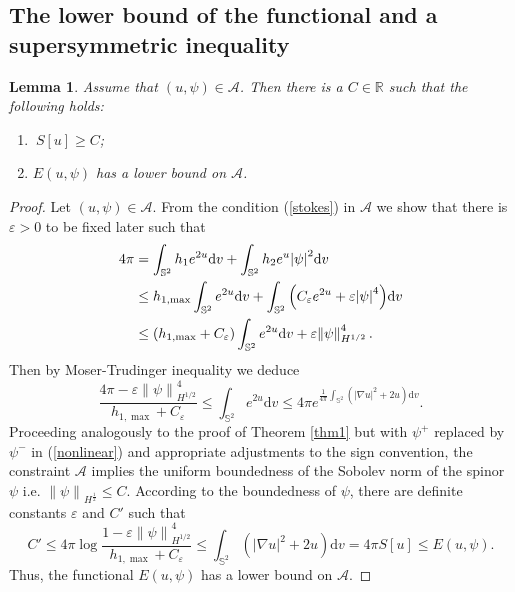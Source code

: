 \documentclass[a4paper, 12pt]{article}
\newtheorem{lemma}[theorem]{Lemma}
\begin{document}
\subsection{The lower bound of the functional and a supersymmetric inequality}	
\begin{lemma}\label{lower-bound}
	Assume that \((u, \psi) \in \mathcal{A}\). Then there is a $C\in \mathbb{R}$ such that the following holds:
	\begin{enumerate}[label=\roman*), leftmargin=*]
		\setcounter{enumi}{0}
		\item $\ S\left[ u \right] \geq C$;
		\item $E(u,\psi)$ has a lower bound on $\mathcal{A}$.
	\end{enumerate}
\end{lemma}
\begin{proof}
	Let \((u, \psi) \in \mathcal{A}\). From the condition (\ref{stokes}) in $\mathcal{A}$ we show that there is $\varepsilon>0$ to be fixed later such that \begin{equation}\label{epsilon}
		\begin{aligned}
			4\pi  &= \int_{{\mathbb{S}^2}} {h_1{e^{2u}}}{\text{d}{v}}  + \int_{{\mathbb{S}^2}} {h_2}{{ e^{u}}{{\left| \psi  \right|}^2}}{\text{d}{v}}  \\
			&\leq {h_{1,\max}}\int_{{\mathbb{S}^2}} {{e^{2u}}} {\text{d}{v}} + \int_{{\mathbb{S}^2}} {\left( {{C_\varepsilon }{e^{2u}} + \varepsilon {{\left| \psi  \right|}^4}} \right)}{\text{d}{v}}  \\
			&\leq \left( {{h_{1,\max}} + {C_\varepsilon }} \right)\int_{{\mathbb{S}^2}} {{e^{2u}}} {\text{d}{v}}} + \varepsilon {\left\| \psi  \right\|_{H^{1/2}}^4  .
		\end{aligned}
	\end{equation}
	Then by Moser-Trudinger inequality we deduce \begin{equation*}
		\frac{{4\pi  - \varepsilon {{\left\| \psi  \right\|}_{H^{1/2}}^4}}}{{{h_{1,\max}} + {C_\varepsilon }}} \leq \int_{{\mathbb{S}^2}} {{e^{2u}}} {\text{d}{v}} \leq 4\pi {e^{\frac{1}{{4\pi }}\int_{{\mathbb{S}^2}} {\left( {{{\left| {\nabla u} \right|}^2} + 2 u} \right)} {\text{d}{v}}}}.
	\end{equation*}
	Proceeding analogously to the proof of Theorem \ref{thm1} but with $\psi^+$ replaced by $\psi^-$ in (\ref{nonlinear}) and appropriate adjustments to the sign convention,  the constraint \( \mathcal{A} \) implies the uniform boundedness of the Sobolev norm of the spinor \( \psi \) i.e. ${\left\| \psi  \right\|_{{H^{\frac{1}{2}}}}}\leq C$. According to the boundedness of $\psi$, there are definite constants $\varepsilon $ and $C'$ such that
	\begin{equation*}
		C'\leq 4\pi \log \frac{{1 - \varepsilon {{\left\| \psi  \right\|}_{H^{1/2}}^4}}}{{{h_{1,\max}} + {C_\varepsilon }}} \leq \int_{{\mathbb{S}^2}} \left( {{{\left| {\nabla u} \right|}^2}} + 2 u\right){\text{d}{v}} =4\pi  S\left[ u \right]\leq E(u,\psi) .
	\end{equation*}
	Thus, the functional $E(u,\psi)$ has a lower bound on $\mathcal{A}$.
\end{proof}
\end{document}
